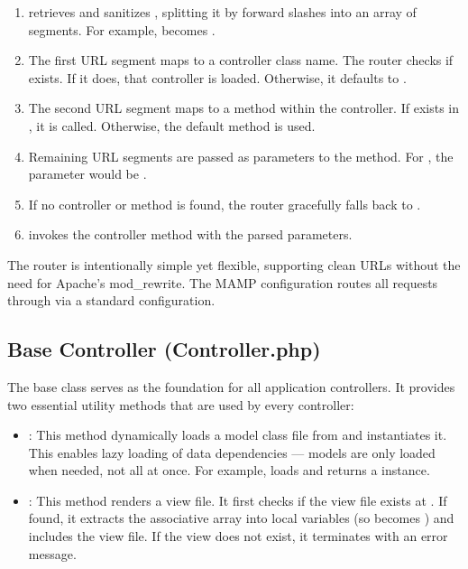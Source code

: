 \documentclass[12pt,a4paper]{report}
\begin{document}
\begin{enumerate}
    \item {} retrieves and sanitizes , splitting it by forward slashes into an array of segments. For example,  becomes .
    \item The first URL segment maps to a controller class name. The router checks if  exists. If it does, that controller is loaded. Otherwise, it defaults to .
    \item The second URL segment maps to a method within the controller. If  exists in , it is called. Otherwise, the default method  is used.
    \item Remaining URL segments are passed as parameters to the method. For , the parameter would be .
    \item If no controller or method is found, the router gracefully falls back to .
    \item {} invokes the controller method with the parsed parameters.
\end{enumerate}

The router is intentionally simple yet flexible, supporting clean URLs without the need for Apache's mod\_rewrite. The MAMP configuration routes all requests through  via a standard  configuration.

\subsection{Base Controller (Controller.php)}

The base  class serves as the foundation for all application controllers. It provides two essential utility methods that are used by every controller:

\begin{itemize}
    \item {}: This method dynamically loads a model class file from  and instantiates it. This enables lazy loading of data dependencies — models are only loaded when needed, not all at once. For example,  loads and returns a  instance.
    
    \item {}: This method renders a view file. It first checks if the view file exists at . If found, it extracts the  associative array into local variables (so  becomes ) and includes the view file. If the view does not exist, it terminates with an error message.
\end{itemize}
\end{document}
